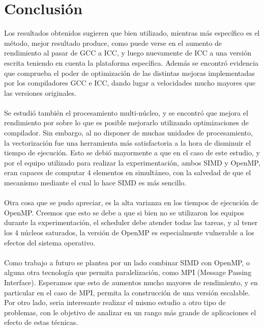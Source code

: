 \section{Conclusión}


Los resultados obtenidos sugieren que bien utilizado, mientras más específico es el método, mejor resultado produce, como puede verse en el aumento de rendimiento al pasar de GCC a ICC, y luego nuevamente de ICC a una versión escrita teniendo en cuenta la plataforma específica. Además se encontró evidencia que comprueba el poder de optimización de las distintas mejoras implementadas por los compiladores GCC e ICC, dando lugar a velocidades mucho mayores que las versiones originales. 
~\\
~\\
Se estudió también el procesamiento multi-núcleo, y se encontró que mejora el rendimiento por sobre lo que es posible mejorarlo utilizando optimizaciones de compilador. Sin embargo, al no disponer de muchas unidades de procesamiento, la vectorización fue una herramienta más satisfactoria a la hora de disminuir el tiempo de ejecución. Esto se debió mayormente a que en el caso de este estudio, y por el equipo utilizado para realizar la experimentación, ambos SIMD y OpenMP, eran capaces de computar 4 elementos en simultáneo, con la salvedad de que el mecanismo mediante el cual lo hace SIMD es más sencillo.
~\\
~\\
 Otra cosa que se pudo apreciar, es la alta varianza en los tiempos de ejecución de OpenMP. Creemos que esto se debe a que si bien no se utilizaron los equipos durante la experimentación, el scheduler debe atender todas las tareas, y al tener los 4 núcleos saturados, la versión de OpenMP es especialmente vulnerable a los efectos del sistema operativo.
~\\
~\\
Como trabajo a futuro se plantea por un lado combinar SIMD con OpenMP, o alguna otra tecnología que permita paralelización, como MPI (Message Passing Interface). Esperamos que esto de aumentos mucho mayores de rendimiento, y en particular en el caso de MPI, permita la construcción de una versión escalable. Por otro lado, seria interesante realizar el mismo estudio a otro tipo de problemas, con le objetivo de analizar en un rango más grande de aplicaciones el efecto de estas técnicas.
